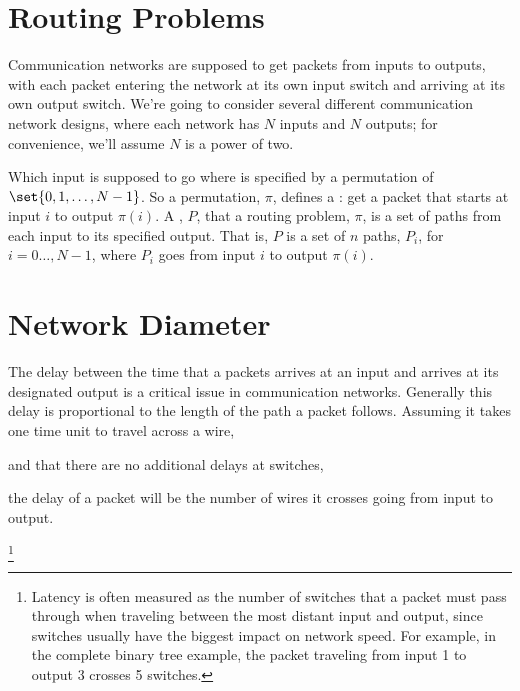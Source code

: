 \section{Routing Problems}

Communication networks are supposed to get packets from inputs to outputs,
with each packet entering the network at its own input switch and arriving
at its own output switch.  We're going to consider several different
communication network designs, where each network has $N$ inputs and
$N$ outputs; for convenience, we'll assume $N$ is a power of two.

Which input is supposed to go where is specified by a permutation of
$\set{0, 1, \dots, N - 1}$.  So a permutation, $\pi$, defines a : get a packet that starts at input $i$ to output
$\pi(i)$.  A , $P$, that  a routing problem,
$\pi$, is a set of paths from each input to its specified output.  That
is, $P$ is a set of $n$ paths, $P_i$, for $i=0\dots,N-1$, where $P_i$ goes
from input $i$ to output $\pi(i)$.

\section{Network Diameter}

The delay between the time that a packets arrives at an input and arrives
at its designated output is a critical issue in communication networks.
Generally this delay is proportional to the length of the path a packet
follows.  Assuming it takes one time unit to travel across a wire,
\begin{staffnotes}
and that there are no additional delays at switches,
\end{staffnotes}
the delay of a packet will be the number of wires it crosses going from
input to output.

\begin{staffnotes}

\footnote{Latency is often measured as the number of switches that
a packet must pass through when traveling between the most distant input
and output, since switches usually have the biggest impact on network
speed.  For example, in the complete binary tree example, the packet
traveling from input 1 to output 3 crosses 5 switches.}

\end{staffnotes}

